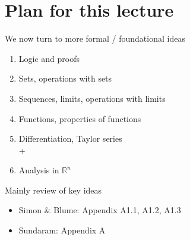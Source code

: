 \documentclass[letterpaper,10pt,english]{jupyterBook}
\begin{document}
\section{Plan for this lecture}
\label{\detokenize{03.set_theory:plan-for-this-lecture}}
\sphinxAtStartPar
We now turn to more formal / foundational ideas
\begin{enumerate}
%
\item {} 
\sphinxAtStartPar
Logic and proofs

\item {} 
\sphinxAtStartPar
Sets, operations with sets

\item {} 
\sphinxAtStartPar
Sequences, limits, operations with limits

\item {} 
\sphinxAtStartPar
Functions, properties of functions

\item {} 
\sphinxAtStartPar
Differentiation, Taylor series\\
+

\item {} 
\sphinxAtStartPar
Analysis in \(\mathbb{R}^n\)

\end{enumerate}

\sphinxAtStartPar
Mainly review of key ideas

\sphinxAtStartPar
{}
\begin{itemize}
\item {} 
\sphinxAtStartPar
Simon \& Blume: Appendix A1.1, A1.2, A1.3

\item {} 
\sphinxAtStartPar
Sundaram: Appendix A

\end{itemize}
\end{document}
